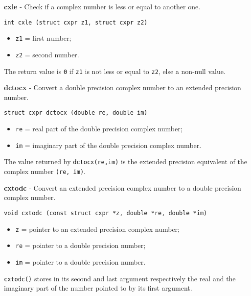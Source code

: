 \documentclass{article}
\begin{document}
\textbf{cxle} - Check if a complex number is less or equal to another one.

\begin{verbatim}
int cxle (struct cxpr z1, struct cxpr z2)
\end{verbatim}

\begin{itemize}
\item \texttt{z1} = first number;
\item \texttt{z2} = second number.
\end{itemize}

The return value is \texttt{0} if \texttt{z1} is not less or equal to \texttt{z2},
else a non-null value.


\hrulefill{}

\textbf{dctocx} - Convert a double precision complex number to
an extended precision number.

\begin{verbatim}
struct cxpr dctocx (double re, double im)
\end{verbatim}

\begin{itemize}
\item \texttt{re} = real part of the double precision complex number;
\item \texttt{im} = imaginary part of the double precision complex number.
\end{itemize}

The value returned by \texttt{dctocx(re,im)} is the
extended precision equivalent of the complex number
\texttt{(re, im)}.


\hrulefill{}

\textbf{cxtodc} - Convert an extended precision complex number to
a double precision complex number.

\begin{verbatim}
void cxtodc (const struct cxpr *z, double *re, double *im)
\end{verbatim}

\begin{itemize}
\item \texttt{z} = pointer to an extended precision complex number;
\item \texttt{re} = pointer to a double precision number;
\item \texttt{im} = pointer to a double precision number.
\end{itemize}

\texttt{cxtodc()} stores in its second and last argument respectively
the real and the imaginary part of the number
pointed to by its first argument.
\end{document}
